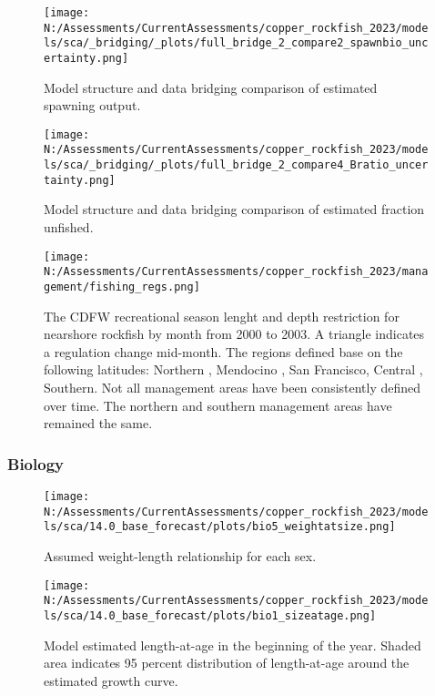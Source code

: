 \documentclass[11pt,
  english,
  letterpaper,
]{article}
\begin{document}
\begin{figure}
\centering
\texttt{[image: N:/Assessments/CurrentAssessments/copper\_rockfish\_2023/models/sca/\_bridging/\_plots/full\_bridge\_2\_compare2\_spawnbio\_uncertainty.png]}
\caption{Model structure and data bridging comparison of estimated spawning output.\label{fig:data-bridge-ssb-2}}
\end{figure}

\pagebreak

\begin{figure}
\centering
\texttt{[image: N:/Assessments/CurrentAssessments/copper\_rockfish\_2023/models/sca/\_bridging/\_plots/full\_bridge\_2\_compare4\_Bratio\_uncertainty.png]}
\caption{Model structure and data bridging comparison of estimated fraction unfished.\label{fig:data-bridge-depl-2}}
\end{figure}

\pagebreak

\begin{figure}
\centering
\texttt{[image: N:/Assessments/CurrentAssessments/copper\_rockfish\_2023/management/fishing\_regs.png]}
\caption{The CDFW recreational season lenght and depth restriction for nearshore rockfish by month from 2000 to 2003. A triangle indicates a regulation change mid-month. The regions defined base on the following latitudes: Northern , Mendocino , San Francisco, Central , Southern. Not all management areas have been consistently defined over time. The northern and southern management areas have remained the same.\label{fig:depth-closures}}
\end{figure}

\pagebreak

\hypertarget{biology-1}{%
\subsubsection{Biology}\label{biology-1}}

\begin{figure}
\centering
\texttt{[image: N:/Assessments/CurrentAssessments/copper\_rockfish\_2023/models/sca/14.0\_base\_forecast/plots/bio5\_weightatsize.png]}
\caption{Assumed weight-length relationship for each sex.\label{fig:est-len-wght}}
\end{figure}

\pagebreak

\begin{figure}
\centering
\texttt{[image: N:/Assessments/CurrentAssessments/copper\_rockfish\_2023/models/sca/14.0\_base\_forecast/plots/bio1\_sizeatage.png]}
\caption{Model estimated length-at-age in the beginning of the year. Shaded area indicates 95 percent distribution of length-at-age around the estimated growth curve.\label{fig:mod-est-len-age}}
\end{figure}
\end{document}
